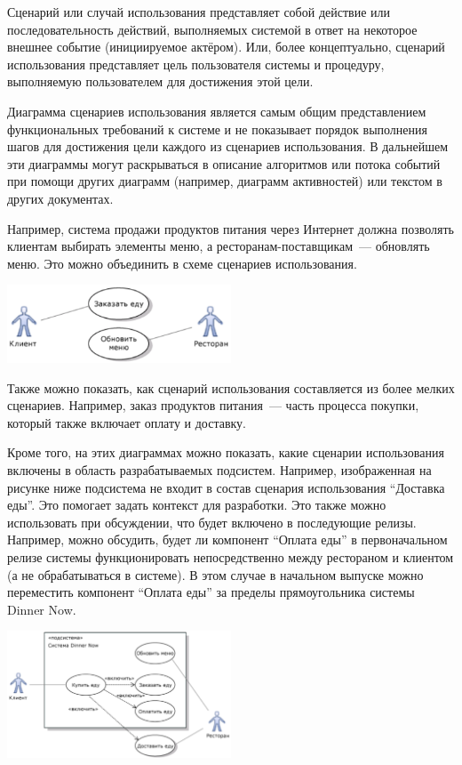 \documentclass{../../text-style}
\begin{document}
Сценарий или случай использования представляет собой действие или последовательность действий, выполняемых системой в ответ на некоторое внешнее событие (инициируемое актёром).
Или, более концептуально, сценарий использования представляет цель пользователя системы и процедуру, выполняемую пользователем для достижения этой цели.

Диаграмма сценариев использования является самым общим представлением функциональных требований к системе и не показывает порядок выполнения шагов для достижения цели каждого из сценариев использования.
В дальнейшем эти диаграммы могут раскрываться в описание алгоритмов или потока событий при помощи других диаграмм (например, диаграмм активностей) или текстом в других документах.

Например, система продажи продуктов питания через Интернет должна позволять клиентам выбирать элементы меню, а ресторанам-поставщикам~--- обновлять меню.
Это можно объединить в схеме сценариев использования.

\begin{center}
    \includegraphics[width=0.5\textwidth]{useCaseSmallExample.png}
\end{center}

Также можно показать, как сценарий использования составляется из более мелких сценариев.
Например, заказ продуктов питания~--- часть процесса покупки, который также включает оплату и доставку.

Кроме того, на этих диаграммах можно показать, какие сценарии использования включены в область разрабатываемых подсистем.
Например, изображенная на рисунке ниже подсистема не входит в состав сценария использования \enquote{Доставка еды}.
Это помогает задать контекст для разработки.
Это также можно использовать при обсуждении, что будет включено в последующие релизы.
Например, можно обсудить, будет ли компонент \enquote{Оплата еды} в первоначальном релизе системы функционировать непосредственно между рестораном и клиентом (а не обрабатываться в системе).
В этом случае в начальном выпуске можно переместить компонент \enquote{Оплата еды} за пределы прямоугольника системы Dinner Now.

\begin{center}
    \includegraphics[width=0.5\textwidth]{useCaseBiggerExample.png}
\end{center}
\end{document}
